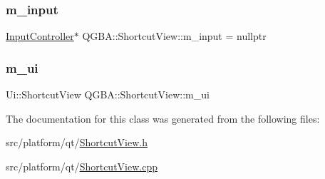 \mbox{\label{class_q_g_b_a_1_1_shortcut_view_ab00dd0cf21989a60332b087768fe083c}} 
\subsubsection{\texorpdfstring{m\+\_\+input}{m\_input}}
{\footnotesize\ttfamily \mbox{\hyperlink{class_q_g_b_a_1_1_input_controller}{Input\+Controller}}$\ast$ Q\+G\+B\+A\+::\+Shortcut\+View\+::m\+\_\+input = nullptr\hspace{0.3cm}{\ttfamily [private]}}

\mbox{\label{class_q_g_b_a_1_1_shortcut_view_ac19d7dc85ba909c5781b2643ea1cdecb}} 
\subsubsection{\texorpdfstring{m\+\_\+ui}{m\_ui}}
{\footnotesize\ttfamily Ui\+::\+Shortcut\+View Q\+G\+B\+A\+::\+Shortcut\+View\+::m\+\_\+ui\hspace{0.3cm}{\ttfamily [private]}}



The documentation for this class was generated from the following files\+:\begin{DoxyCompactItemize}
\item 
src/platform/qt/\mbox{\hyperlink{_shortcut_view_8h}{Shortcut\+View.\+h}}\item 
src/platform/qt/\mbox{\hyperlink{_shortcut_view_8cpp}{Shortcut\+View.\+cpp}}\end{DoxyCompactItemize}
